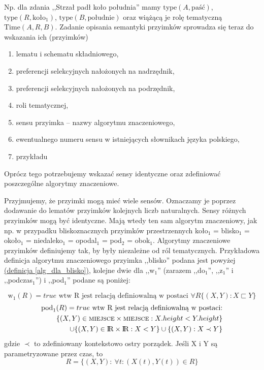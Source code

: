 \documentclass[a4paper, 12pt]{article}
\theoremstyle{remark}
\begin{document}

Np. dla zdania ,,Strzał padł koło południa'' mamy $\text{type}(A,\text{paść})$, 
$\text{type}(R,\text{koło}_1)$, \newline $\text{type}(B,\text{południe})$ oraz wiążącą je rolę tematyczną $\text{Time}(A,R,B)$.
Zadanie opisania semantyki przyimków sprowadza się teraz do wskazania ich (przyimków) 
\begin{enumerate}
\item lematu i schematu składniowego, 
\item preferencji selekcyjnych nałożonych na nadrzędnik, 
\item preferencji selekcyjnych nałożonych na podrzędnik, 
\item roli tematycznej, 
\item sensu przyimka -- nazwy algorytmu znaczeniowego,
\item ewentualnego numeru sensu w istniejących słownikach języka polskiego,
\item przykładu
\end{enumerate}
Oprócz tego potrzebujemy wskazać sensy identyczne oraz zdefiniować poszczególne algorytmy znaczeniowe.

Przyjmujemy, że przyimki mogą mieć wiele sensów.
Oznaczamy je poprzez dodawanie do lematów przyimków kolejnych liczb naturalnych. 
Sensy różnych przyimków mogą być identyczne. Mają wtedy ten sam algorytm znaczeniowy, jak np. w przypadku bliskoznacznych przyimków przestrzennych
koło$_1$ = blisko$_1$ = około$_1$ = niedaleko$_1$ = opodal$_1$ = pod$_2$ = obok$_1$.
Algorytmy znaczeniowe przyimków definiujemy tak, by były niezależne od ról tematycznych. Przykładowa definicja algorytmu znaczeniowego przyimka ,,blisko'' podana jest powyżej \hyperref[alg_dla_blisko]{(definicja \ref*{alg_dla_blisko})}, kolejne dwie dla ,,w$_1$'' (zarazem ,,do$_1$'', ,,z$_1$'' i ,,podczas$_1$'') i ,,pod$_1$'' podane są poniżej:

\begin{equation}
	\text{w}_1(R) = true \text{\ wtw R jest relacją definiowalną w postaci\ } \forall R\{(X,Y): X \sqsubset Y\}
\end{equation}
\begin{align}
\nonumber \text{pod}_1(R) = true \text{\ wtw R jest relacją definiowalną w postaci:}\\
  \{(X,Y) \in \textsc{miejsce} \times \textsc{miejsce}: X.height < Y.height\}\\
  \nonumber \cup \{(X,Y) \in \text{I\!R} \times \text{I\!R}: X < Y\} 
  \cup \{(X,Y): X \prec Y\}
\end{align}
  gdzie $\prec$ to zdefiniowany kontekstowo ostry porządek. \newline Jeśli X i Y są parametryzowane przez czas, to
\begin{equation}
	R=\{(X,Y)\!:\  \forall t\!: (X(t),Y(t)) \in R\}
\end{equation}
\end{document}
